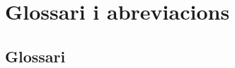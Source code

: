 \documentclass[CAT,BIB]{TFUOC}%
\begin{document}
\chapter{Glossari i abreviacions}

    \section{Glossari}

    \printglossary[type=\acronymtype, title={Abreviacions}]





\newpage
\appendix

%
%
\end{document}
